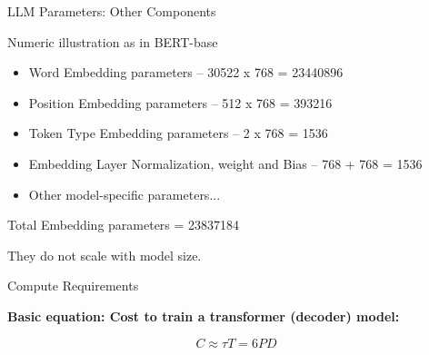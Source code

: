 
\begin{vbframe}{LLM Parameters: Other Components}

\vfill

Numeric illustration as in BERT-base \\ \vskip5mm

\begin{itemize}
    \item Word Embedding parameters -- 30522 x 768 = 23440896
    \item Position Embedding parameters -- 512 x 768 = 393216
	\item Token Type Embedding parameters -- 2 x 768 = 1536
	\item Embedding Layer Normalization, weight and Bias -- 768 + 768 = 1536
	\item Other model-specific parameters...
\end{itemize}

\vskip5mm

Total Embedding parameters = 23837184 \vskip3mm

They do not scale with model size.

\vfill

\end{vbframe}


\begin{vbframe}{Compute Requirements}

\vfill

\textbf{Basic equation: Cost to train a transformer (decoder) model:}

\vspace{1.5cm}

$$C \approx \tau T = 6 P D$$ 

\vspace{1.5cm}

\centering {}

\vfill

\end{vbframe}


